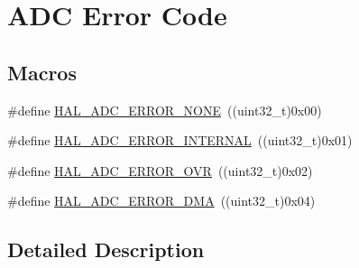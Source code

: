 \hypertarget{group___a_d_c___error___code}{\section{A\-D\-C Error Code}
\label{group___a_d_c___error___code}
}
\subsection*{Macros}
\begin{DoxyCompactItemize}
\item 
\#define \hyperlink{group___a_d_c___error___code_ga93b4576d46ee0f8c53b7d69f39778e38}{H\-A\-L\-\_\-\-A\-D\-C\-\_\-\-E\-R\-R\-O\-R\-\_\-\-N\-O\-N\-E}~((uint32\-\_\-t)0x00)
\item 
\#define \hyperlink{group___a_d_c___error___code_ga7182f9ffc028f217db8724c7bc348f2f}{H\-A\-L\-\_\-\-A\-D\-C\-\_\-\-E\-R\-R\-O\-R\-\_\-\-I\-N\-T\-E\-R\-N\-A\-L}~((uint32\-\_\-t)0x01)
\item 
\#define \hyperlink{group___a_d_c___error___code_ga30ce24556ebd3c0341558c700a3b9add}{H\-A\-L\-\_\-\-A\-D\-C\-\_\-\-E\-R\-R\-O\-R\-\_\-\-O\-V\-R}~((uint32\-\_\-t)0x02)
\item 
\#define \hyperlink{group___a_d_c___error___code_gaea82628f53a8e30db3f3426922acf60f}{H\-A\-L\-\_\-\-A\-D\-C\-\_\-\-E\-R\-R\-O\-R\-\_\-\-D\-M\-A}~((uint32\-\_\-t)0x04)
\end{DoxyCompactItemize}


\subsection{Detailed Description}


